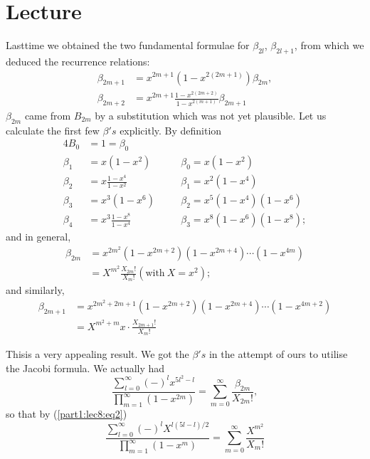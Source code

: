 \chapter{Lecture}\label{part1:lec8}

Last\pageoriginale time we obtained the two fundamental formulae for
$\beta_{2l}$, $\beta_{2l+1}$, from which we deduced the recurrence relations:
\begin{equation*}
  \begin{aligned}
    \beta_{2m+1} & = x^{2m+1} (1-x^{2(2m+1)}) \beta_{2m},\\
    \beta_{2m+2} & = x^{2m+1} \frac{1-x^{2(2m+2)}}{1-x^{2(m+1)}} \beta_{2m+1}
  \end{aligned}\tag{1}\label{part1:lec8:eq1}
\end{equation*}
$\beta_{2m}$ came from $B_{2m}$ by a substitution which was not
yet plausible. Let us calculate the first few $\beta's$ explicitly. By
definition
\begin{alignat*}{4}
 B_0 &=1 = \beta_0&\quad &\\
  \beta_1 & = x(1-x^2) && \beta_0  = x(1-x^2)\\
  \beta_2 & = x \frac{1-x^4}{1-x^2} && \beta_1  = x^2 (1-x^4)\\
  \beta_3 & = x^3 (1-x^6) && \beta_2  = x^5 (1-x^4) (1-x^6)\\
  \beta_4 & = x^3 \frac{1-x^8}{1-x^4} && \beta_3  = x^8 (1-x^6)(1-x^8);
\end{alignat*}
and in general,
\begin{align*}
  \beta_{2m} & = x^{2m^2} (1-x^{2m+2}) (1-x^{2m+4}) \cdots
  (1-x^{4m})\\
  & = X^{m^2} \frac{X_{2m}!}{X_m!} (\text{with}~ X=x^2);
  \tag{2}\label{part1:lec8:eq2} 
\end{align*}
and similarly,
\begin{align*}
  \beta_{2m+1} & = x^{2m^2+2m+1} (1-x^{2m+2}) (1-x^{2m+4}) \cdots
  (1-x^{4m+2})\\
  & = X^{m^2+m} x\cdot  \frac{X_{2m+1}!}{X_m!}  \tag{3}\label{part1:lec8:eq3}
\end{align*}

This\pageoriginale is a very appealing result. We got the $\beta's$
in the attempt of ours to utilise the Jacobi formula. We actually had
$$
\frac{\sum\limits^\infty_{l=0} (-)^{l} x^{5l^2
    -l}}{\prod\limits^\infty_{m=1} (1-x^{2m})} = \sum^\infty_{m=0}
\frac{\beta_{2m}}{X_{2m}!}, 
$$
so that by (\ref{part1:lec8:eq2})
\begin{equation*}
  \frac{\sum\limits^\infty_{l=0} (-)^{l} X^{l(5l
      -l)/2}}{\prod\limits^\infty_{m=1} (1-x^{m})} = \sum^\infty_{m=0}
  \frac{X^{m^2}}{X_m!} \tag{4}\label{part1:lec8:eq4}
\end{equation*}

